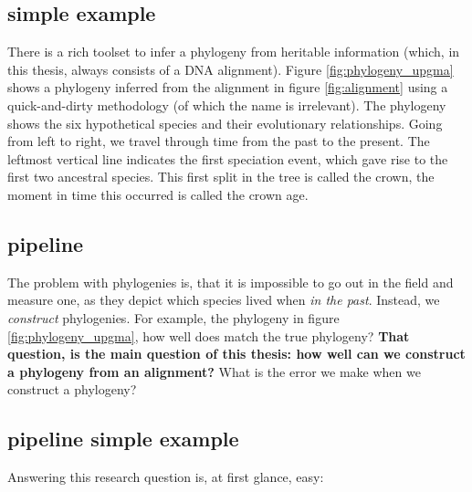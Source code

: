 {%
\subsection{simple example}

There is a rich toolset to infer a phylogeny from heritable 
information (which, in this thesis, always consists of a DNA alignment).
Figure \ref{fig:phylogeny_upgma} shows a phylogeny inferred
from the alignment 
in figure \ref{fig:alignment} using a quick-and-dirty methodology (of
which the name is irrelevant).
The phylogeny shows the six hypothetical species and their evolutionary 
relationships. Going from left to right, we travel through time from 
the past to the present. 
The leftmost vertical line indicates the first speciation event, 
which gave rise to the first two ancestral species. 
This first split in the tree is called the crown,
the moment in time this occurred is called the crown age.

\subsection{pipeline}

The problem with phylogenies is, 
that it is impossible to go out in the field and measure one, 
as they depict which species lived when \emph{in the past}.
Instead, we \emph{construct} phylogenies. For example,
the phylogeny in figure \ref{fig:phylogeny_upgma}, how well
does match the true phylogeny? \textbf{That question, is the main question of this 
thesis: how well can we construct a
phylogeny from an alignment?} What is the error we
make when we construct a phylogeny?

\subsection{pipeline simple example}

Answering this research question is, at first glance, easy: 

}
